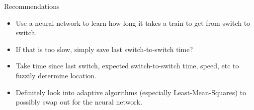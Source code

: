 \documentclass{beamer}
\begin{document}

\begin{frame}{Recommendations}
	\begin{itemize}
		\item Use a neural network to learn how long it takes a train to get
from switch to switch.
		\item If that is too slow, simply save last switch-to-switch time?
		\item Take time since last switch, expected switch-to-switch time,
speed, etc to fuzzily determine location.
		\item Definitely look into adaptive algorithms (especially
Least-Mean-Squares) to possibly swap out for the neural network.
	\end{itemize}
\end{frame}
\end{document}
